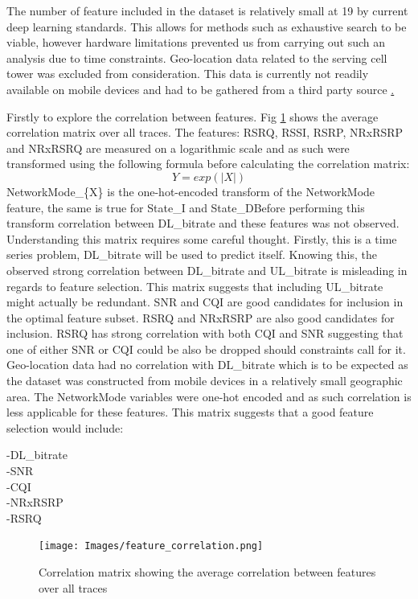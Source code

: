 The number of feature included in the dataset is relatively small at 19 by current deep learning standards. This allows for methods such as exhaustive search to be viable, however hardware limitations prevented us from carrying out such an analysis due to time constraints. Geo-location data related to the serving cell tower was excluded from consideration. This data is currently not readily available on mobile devices and had to be gathered from a third party source \href{https://opencellid.org/}.

Firstly to explore the correlation between features. Fig \ref{fig:feature_correlation} shows the average correlation matrix over all traces. The features: RSRQ, RSSI, RSRP, NRxRSRP and NRxRSRQ are measured on a logarithmic scale and as such were transformed using the following formula before calculating the correlation matrix:
\begin{equation}
Y = exp(\left|X\right|)
\end{equation}
NetworkMode\_\{X\} is the one-hot-encoded transform of the NetworkMode feature, the same is true for State\_I and State\_DBefore performing this transform correlation between DL\_bitrate and these features was not observed. Understanding this matrix requires some careful thought. Firstly, this is a time series problem, DL\_bitrate will be used to predict itself. Knowing this, the observed strong correlation between DL\_bitrate and UL\_bitrate is misleading in regards to feature selection. This matrix suggests that including UL\_bitrate might actually be redundant. SNR and CQI are good candidates for inclusion in the optimal feature subset. RSRQ and NRxRSRP are also good candidates for inclusion. RSRQ has strong correlation with both CQI and SNR suggesting that one of either SNR or CQI could be also be dropped should constraints call for it. Geo-location data had no correlation with DL\_bitrate which is to be expected as the dataset was constructed from mobile devices in a relatively small geographic area. The NetworkMode variables were one-hot encoded and as such correlation is less applicable for these features. This matrix suggests that a good feature selection would include:

-DL\_bitrate \\
-SNR \\
-CQI \\
-NRxRSRP \\
-RSRQ \\

\newpage
\begin{figure}[H]
\texttt{[image: Images/feature\_correlation.png]}
\centering
\caption{Correlation matrix showing the average correlation between features over all traces}
\label{fig:feature_correlation}
\end{figure}

